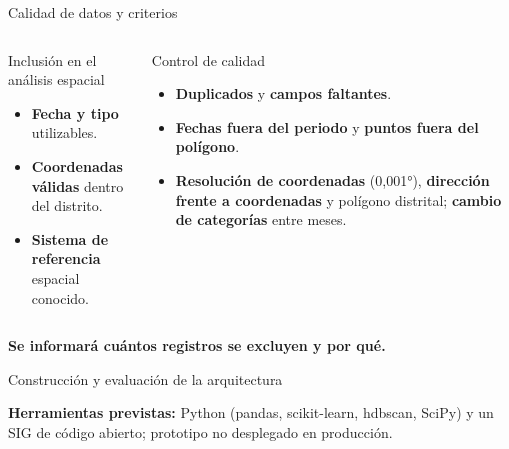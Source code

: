 \documentclass[aspectratio=169,10pt]{beamer}
\newcommand{\chev}[5]{%
    \pgfmathsetmacro{\xo}{#1*2.68}%
    \fill[#2] (\xo,0)--(\xo+2.58,0)--(\xo+2.9,.62)--(\xo+2.58,1.24)--(\xo,1.24)--(\xo+.32,.62)--cycle;
    \node[text=white,font=\footnotesize\bfseries,align=center,text width=2.0cm] at (\xo+1.5,.62) {#3};
    \node[anchor=north,fill=TesisGris,rounded corners=3pt,inner sep=5pt] at (\xo+1.45,-.2)
      {\parbox[t][1.9cm][t]{2.4cm}{\raggedright\footnotesize #4}};}
\begin{document}
\begin{frame}{Calidad de datos y criterios}
  \begin{columns}[T,onlytextwidth]
      \begin{block}{Inclusión en el análisis espacial}
        \begin{itemize}
          \item \textbf{Fecha y tipo} utilizables.
          \item \textbf{Coordenadas válidas} dentro del distrito.
          \item \textbf{Sistema de referencia} espacial conocido.
        \end{itemize}
      \end{block}
      \begin{block}{Control de calidad}
        \begin{itemize}
          \item \textbf{Duplicados} y \textbf{campos faltantes}.
          \item \textbf{Fechas fuera del periodo} y \textbf{puntos fuera del polígono}.
          \item \textbf{Resolución de coordenadas} (0,001°), \textbf{dirección frente a coordenadas} y polígono distrital; \textbf{cambio de categorías} entre meses.
        \end{itemize}
      \end{block}
  \end{columns}
  \vspace{.3cm}
  \centering\textbf{Se informará \textbf{cuántos registros se excluyen y por qué}.}
\end{frame}

\begin{frame}{Construcción y evaluación de la arquitectura}
  \centering
  \vspace{.35cm}
  \begin{tarjeta}[halign=center]
    \small\textbf{Herramientas previstas:} Python (pandas, scikit-learn, hdbscan, SciPy) y un SIG de código abierto; prototipo no desplegado en producción.
  \end{tarjeta}
\end{frame}
\end{document}
